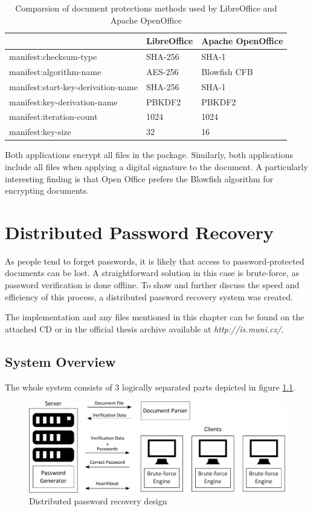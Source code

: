\documentclass[11pt,oneside]{fithesis2}
\begin{document}
\begin{table}[h]
	\centering
	\begin{tabular}{|l|l|l|}
               \hline
		&\textbf{LibreOffice}&\textbf{Apache OpenOffice}\\
	\hline
		manifest:checksum-type&SHA-256&SHA-1\\
	\hline
		manifest:algorithm-name&AES-256&Blowfish CFB\\
	\hline
		manifest:start-key-derivation-name&SHA-256&SHA-1\\
		manifest:key-derivation-name&PBKDF2&PBKDF2\\
		manifest:iteration-count&1024&1024\\
		manifest:key-size&32&16\\
	\hline
           \end{tabular}
	\caption{Comparsion of document protections methods used by LibreOffice and Apache OpenOffice}
	\label{odt_impl_results}
\end{table}

Both applications encrypt all files in the package. Similarly, both applications include all files when applying a digital signature to the document. A particularly interesting finding is that Open Office prefers the Blowfish algorithm for encrypting documents.

\chapter{Distributed Password Recovery}

As people tend to forget passwords, it is likely that access to password-protected documents can be lost. A straightforward solution in this case is brute-force, as password verification is done offline. To show and further discuss the speed and efficiency of this process, a distributed password recovery system was created.

The implementation and any files mentioned in this chapter can be found on the attached CD or in the official thesis archive available at \textit{http://is.muni.cz/}.

\section{System Overview}

The whole system consists of 3 logically separated parts depicted in figure \ref{ddpbf_design}. 

\begin{figure}[ht]
	\centering
	\includegraphics[width=1\textwidth]{figures/ddpbf_design.pdf}
	\caption{Distributed password recovery design}
	\label{ddpbf_design}
\end{figure}
\end{document}
